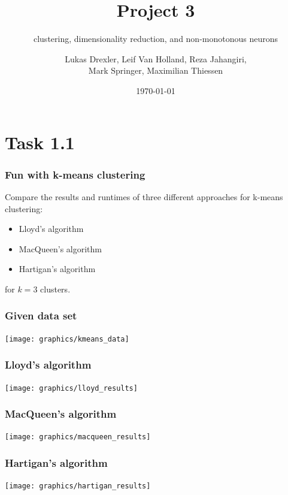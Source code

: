 \documentclass{beamer}
\title[Project 3]{Project 3}
\subtitle{clustering, dimensionality reduction, and non-monotonous neurons}
\author{Lukas Drexler, Leif Van Holland, Reza Jahangiri,\\Mark Springer, Maximilian Thiessen}
\institute[Universität Bonn]{Rheinische Friedrich-Wilhelms-Universität}
\date{\today}
\begin{document}
	
\begin{frame}%
	\titlepage
\end{frame}



\section{Task 1.1}

\begin{frame}
\frametitle{Fun with k-means clustering}
Compare the results and runtimes of three different approaches for k-means clustering:
\begin{itemize}
\item Lloyd's algorithm
\item MacQueen's algorithm
\item Hartigan's algorithm
\end{itemize}
for $k=3$ clusters.
\end{frame}

\begin{frame}
\frametitle{Given data set}
\texttt{[image: graphics/kmeans\_data]}
\end{frame}

\begin{frame}
\frametitle{Lloyd's algorithm}
\texttt{[image: graphics/lloyd\_results]}
\end{frame}

\begin{frame}
\frametitle{MacQueen's algorithm}
\texttt{[image: graphics/macqueen\_results]}
\end{frame}

\begin{frame}
\frametitle{Hartigan's algorithm}
\texttt{[image: graphics/hartigan\_results]}
\end{frame}

\end{document}
